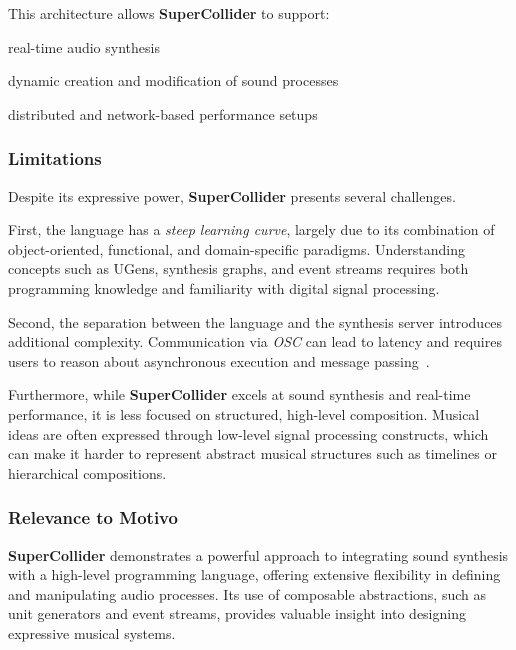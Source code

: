 This architecture allows \textbf{SuperCollider} to support:

\noindent real-time audio synthesis

\noindent dynamic creation and modification of sound processes

\noindent distributed and network-based performance setups


\subsubsection{Limitations}

Despite its expressive power, \textbf{SuperCollider} presents several challenges.

First, the language has a \textit{steep learning curve}, largely due to its combination of object-oriented, functional,
and domain-specific paradigms.
Understanding concepts such as UGens, synthesis graphs, and event streams requires both programming knowledge and
familiarity with digital signal processing.

Second, the separation between the language and the synthesis server introduces additional complexity.
Communication via \textit{OSC} can lead to latency and requires users to reason about asynchronous execution
and message passing~\cite{McCartney_2002}.

Furthermore, while \textbf{SuperCollider} excels at sound synthesis and real-time performance, it is less focused on
structured, high-level composition.
Musical ideas are often expressed through low-level signal processing constructs, which can make it harder to represent
abstract musical structures such as timelines or hierarchical compositions.


\subsubsection{Relevance to Motivo}

\textbf{SuperCollider} demonstrates a powerful approach to integrating sound synthesis with a high-level
programming language, offering extensive flexibility in defining and manipulating audio processes.
Its use of composable abstractions, such as unit generators and event streams, provides valuable insight into designing
expressive musical systems.

